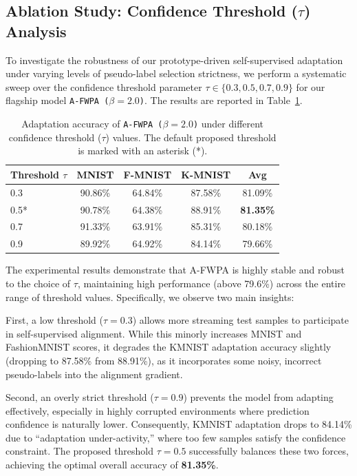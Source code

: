 \documentclass{article}
\theoremstyle{plain}
\theoremstyle{definition}
\theoremstyle{remark}
\begin{document}
\subsection{Ablation Study: Confidence Threshold ($\tau$) Analysis}
To investigate the robustness of our prototype-driven self-supervised adaptation under varying levels of pseudo-label selection strictness, we perform a systematic sweep over the confidence threshold parameter $\tau \in \{0.3, 0.5, 0.7, 0.9\}$ for our flagship model \texttt{A-FWPA ($\beta=2.0$)}. The results are reported in Table~\ref{tab:tau_ablation}.

\begin{table}[h]
\caption{Adaptation accuracy of \texttt{A-FWPA ($\beta=2.0$)} under different confidence threshold ($\tau$) values. The default proposed threshold is marked with an asterisk (*).}
\label{tab:tau_ablation}
\vskip 0.15in
\begin{center}
\footnotesize
\setlength{\tabcolsep}{4pt}
\begin{tabular}{lcccc}
\toprule
\textbf{Threshold $\tau$} & \textbf{MNIST} & \textbf{F-MNIST} & \textbf{K-MNIST} & \textbf{Avg} \\
\midrule
0.3 & 90.86\% & 64.84\% & 87.58\% & 81.09\% \\
0.5* & 90.78\% & 64.38\% & 88.91\% & \textbf{81.35\%} \\
0.7 & 91.33\% & 63.91\% & 85.31\% & 80.18\% \\
0.9 & 89.92\% & 64.92\% & 84.14\% & 79.66\% \\
\bottomrule
\end{tabular}
\end{center}
\vskip -0.1in
\end{table}

The experimental results demonstrate that A-FWPA is highly stable and robust to the choice of $\tau$, maintaining high performance (above 79.6\%) across the entire range of threshold values. Specifically, we observe two main insights:

First, a low threshold ($\tau = 0.3$) allows more streaming test samples to participate in self-supervised alignment. While this minorly increases MNIST and FashionMNIST scores, it degrades the KMNIST adaptation accuracy slightly (dropping to 87.58\% from 88.91\%), as it incorporates some noisy, incorrect pseudo-labels into the alignment gradient.

Second, an overly strict threshold ($\tau = 0.9$) prevents the model from adapting effectively, especially in highly corrupted environments where prediction confidence is naturally lower. Consequently, KMNIST adaptation drops to 84.14\% due to ``adaptation under-activity,'' where too few samples satisfy the confidence constraint. The proposed threshold $\tau = 0.5$ successfully balances these two forces, achieving the optimal overall accuracy of \textbf{81.35\%}.
\end{document}
